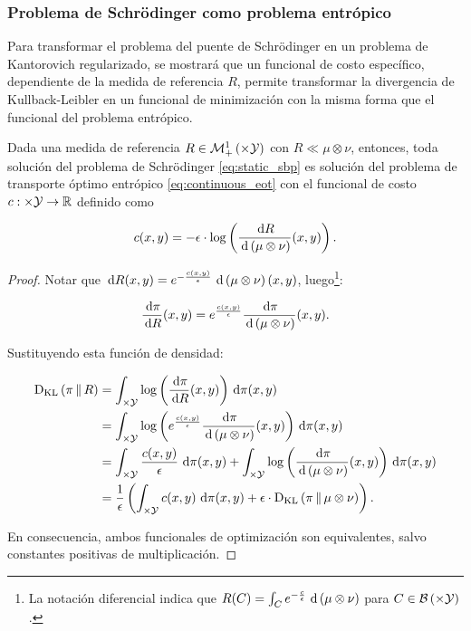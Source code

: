 \subsubsection{Problema de Schrödinger como problema entrópico}

Para transformar el problema del puente de Schrödinger en un problema de Kantorovich regularizado, se mostrará que un funcional de costo específico, dependiente de la medida de referencia $R$, permite transformar la divergencia de Kullback-Leibler en un funcional de minimización con la misma forma que el funcional del problema entrópico.

\begin{prop}
	Dada una medida de referencia $R\in\probmeasure{\xspace\times\yspace}$ con $R\ll\mu\otimes\nu$, entonces, toda solución del problema de Schrödinger \eqref{eq:static_sbp} es solución del problema de transporte óptimo entrópico \eqref{eq:continuous_eot} con el funcional de costo $c:\times\mathcal{Y}\to\mathbb{R}$ definido como

	\begin{equation*}
		c(x,y)=-\epsilon\cdot\log\left(\frac{\,\operatorname{d}\! R}{\,\operatorname{d}\!\,\left(\mu\otimes\nu\right)}(x,y)\right).
	\end{equation*}
\end{prop}

\begin{proof}
	Notar que $\,\operatorname{d}\! R(x,y) = e^{-\frac{c(x,y)}{\epsilon}}\,\operatorname{d}\!\,\left(\mu\otimes\nu\right)(x,y)$, luego\footnote{La notación diferencial indica que $R(C)=\int_{C} e^{-\frac{c}{\epsilon}}\,\operatorname{d}\!\,\left(\mu\otimes\nu\right)$ para $C\in\borel{\xspace\times\yspace}$.}:

	\begin{equation*}
		\frac{\,\operatorname{d}\!\pi}{\,\operatorname{d}\! R}(x,y) = e^{\frac{c(x,y)}{\epsilon}} \frac{\,\operatorname{d}\!\pi}{\,\operatorname{d}\!\,\left(\mu\otimes\nu\right)}(x,y) .
	\end{equation*}

	Sustituyendo esta función de densidad:

	\begin{align*}
		\KL{\pi}{R} &= \int_{\xspace\times\yspace} \log\parent{\frac{\d\pi}{\d R}(x,y)} \d\pi(x,y)\\
		&= \int_{\xspace\times\yspace} \log\parent{e^{\frac{c(x,y)}{\epsilon}}\frac{\d\pi}{\d\,\parent{\mu\otimes\nu}}(x,y)} \d\pi(x,y)\\
		&= \int_{\xspace\times\yspace} \frac{c(x,y)}{\epsilon} \d\pi(x,y) + \int_{\xspace\times\yspace} \log\parent{\frac{\d\pi}{\d\,\parent{\mu\otimes\nu}}(x,y)} \d\pi(x,y)\\
		&= \frac{1}{\epsilon}\parent{\int_{\xspace\times\yspace} c(x,y) \d\pi(x,y) + \epsilon\cdot\KL{\pi}{\mu\otimes\nu}}.
	\end{align*}

	En consecuencia, ambos funcionales de optimización son equivalentes, salvo constantes positivas de multiplicación.

\end{proof}

